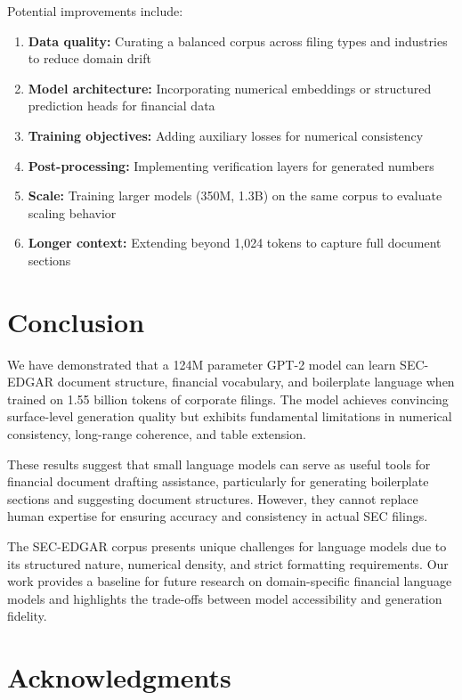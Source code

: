 \documentclass[12pt]{article}
\begin{document}
Potential improvements include:
\begin{enumerate}
    \item \textbf{Data quality:} Curating a balanced corpus across filing types and industries to reduce domain drift
    \item \textbf{Model architecture:} Incorporating numerical embeddings or structured prediction heads for financial data
    \item \textbf{Training objectives:} Adding auxiliary losses for numerical consistency
    \item \textbf{Post-processing:} Implementing verification layers for generated numbers
    \item \textbf{Scale:} Training larger models (350M, 1.3B) on the same corpus to evaluate scaling behavior
    \item \textbf{Longer context:} Extending beyond 1,024 tokens to capture full document sections
\end{enumerate}

\section{Conclusion}

We have demonstrated that a 124M parameter GPT-2 model can learn SEC-EDGAR document structure, financial vocabulary, and boilerplate language when trained on 1.55 billion tokens of corporate filings. The model achieves convincing surface-level generation quality but exhibits fundamental limitations in numerical consistency, long-range coherence, and table extension.

These results suggest that small language models can serve as useful tools for financial document drafting assistance, particularly for generating boilerplate sections and suggesting document structures. However, they cannot replace human expertise for ensuring accuracy and consistency in actual SEC filings.

The SEC-EDGAR corpus presents unique challenges for language models due to its structured nature, numerical density, and strict formatting requirements. Our work provides a baseline for future research on domain-specific financial language models and highlights the trade-offs between model accessibility and generation fidelity.

\section*{Acknowledgments}
\end{document}
